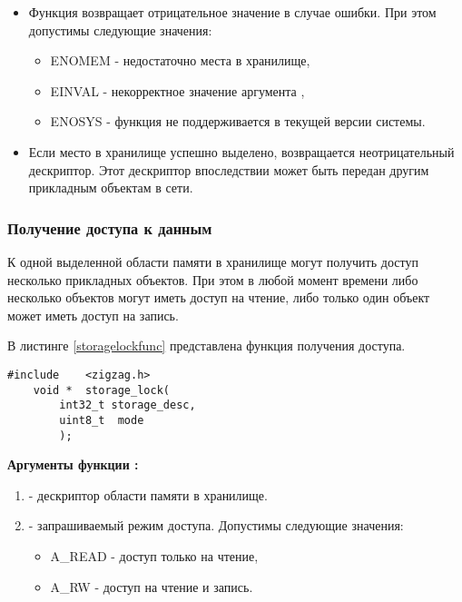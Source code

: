 {\itshape
\begin{itemize}
\item Функция возвращает отрицательное значение в случае ошибки. При этом допустимы следующие значения:
    \begin{itemize}
        \item ENOMEM - недостаточно места в хранилище,
        \item EINVAL - некорректное значение аргумента ,
        \item ENOSYS - функция не поддерживается в текущей версии системы.
    \end{itemize}
\item Если место в хранилище успешно выделено, возвращается неотрицательный дескриптор. Этот дескриптор впоследствии
может быть передан другим прикладным объектам в сети.
\end{itemize}
}

\subsubsection{Получение доступа к данным}

К одной выделенной области памяти в хранилище могут получить доступ несколько прикладных объектов. При этом
в любой момент времени либо несколько объектов могут иметь доступ на чтение, либо только один объект может иметь доступ на запись.

В листинге \ref{storagelockfunc} представлена функция получения доступа.

\begin{lstlisting}[caption=Функция \myfunc{storage\_lock()} - доступ к хранилищу, label=storagelockfunc ]
    #include    <zigzag.h>
    void *  storage_lock(
        int32_t storage_desc,
        uint8_t  mode
        );
\end{lstlisting}

{\bfseries Аргументы функции :}

{\itshape
\begin{enumerate} 
\item {} - дескриптор области памяти в хранилище.
\item {} - запрашиваемый режим доступа. Допустимы следующие значения:
    \begin{itemize}
        \item A\_READ - доступ только на чтение,
        \item A\_RW - доступ на чтение и запись.
    \end{itemize}
\end{enumerate}
}

